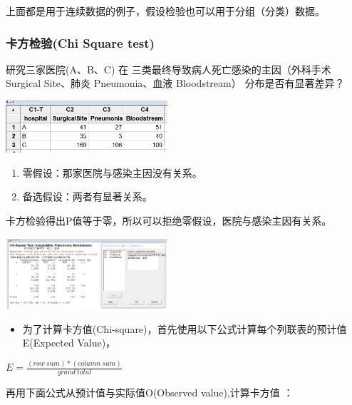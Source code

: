 上面都是用于连续数据的例子，假设检验也可以用于分组（分类）数据。

\hypertarget{ux5361ux65b9ux68c0ux9a8cchi-square-test}{%
\subsubsection{卡方检验(Chi Square
test)}\label{ux5361ux65b9ux68c0ux9a8cchi-square-test}}

研究三家医院(A、B、C) 在
三类最终导致病人死亡感染的主因（外科手术Surgical Site、肺炎
Pneumonia、血液 Bloodstream） 分布是否有显著差异？


\includegraphics[width=6cm]{4chiSquareDataScreenshot_2022-07-24_110053.jpg}

\begin{enumerate}
\tightlist
\item
  零假设：那家医院与感染主因没有关系。
\item
  备选假设：两者有显著关系。
\end{enumerate}

卡方检验得出P值等于零，所以可以拒绝零假设，医院与感染主因有关系。


\includegraphics[width=6cm]{6chiSquareTstResultScreenshot_2022-07-24_103606-1.jpg}

\begin{itemize}
\tightlist
\item
  为了计算卡方值(Chi-square)，首先使用以下公式计算每个列联表的预计值E(Expected
  Value)，
\end{itemize}

\(E = \frac{(row \ sum) * (column \ sum)} {grand \ total}\)

再用下面公式从预计值与实际值O(Observed value),计算卡方值 ：


